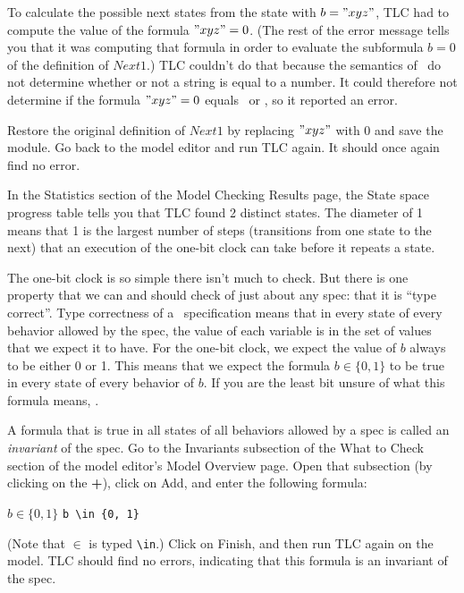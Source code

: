 To calculate the possible next states from the state with $b="xyz"$,
TLC had to compute the value of the formula $"xyz"=0$.  (The rest of
the error message tells you that it was computing that formula in
order to evaluate the subformula $b=0$ of the definition of $Next1$.)
TLC couldn't do that because the semantics of \tlaplus\ do not
determine whether or not a string is equal to a 
number.  It could
therefore not determine if the formula $"xyz"=0$ equals \TRUE\ or
\FALSE, so it reported an error. 

Restore the original definition of $Next1$ by replacing $"xyz"$ with 0
and save the module.  Go back to the model editor and run TLC again.
It should once again find no error.

\pause
%
\noindent 
%
In the \textsf{Statistics} section of the \textsf{Model Checking
Results} page, the \textsf{State space progress} table tells you that
TLC found 2 distinct states.  The diameter of 1 means that 1 is the
largest number of steps (transitions from one state to the next) that
an execution of the one-bit clock can take before it repeats a state.

The one-bit clock is so simple there isn't much to check.  But there
is one property that we can and should check of just about any spec:
that it is 
``type correct''.  Type correctness of a \tlaplus\ specification
means that in every state of every behavior allowed by the spec, the
value of each variable is in the set of values that we expect it to
have.  For the one-bit clock, we expect the value of $b$ always to be
either 0 or 1.  This means that we expect the formula $b\in\{0,1\}$ to
be true in every state of every behavior of $b$.  If you are the least
bit unsure of what this formula means,
\textsf{}.

A formula that is true in all states of all behaviors allowed by a
spec is called an 
\emph{invariant} of the spec.  Go to the
\textsf{Invariants} subsection of the \textsf{What to Check} section
of the model editor's \textsf{Model Overview} page.  Open
that subsection (by clicking on the {\bf \textsf{+}}), click on
\textsf{Add}, and enter the following formula:%
\begin{display}
\begin{twocols}
$b \in \{0, 1\}$
\midcol
\verb|b \in {0, 1}|
\end{twocols}
\end{display}
(Note that $\in$ is typed \verb|\in|.)  Click on \textsf{Finish}, and
then run TLC again on the model.  TLC should find no errors,
indicating that this formula is an invariant of the spec.

